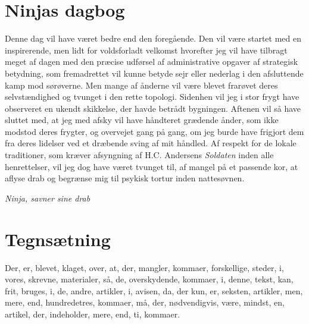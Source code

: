 \begin{minipage}[t]{100mm}
\section*{Ninjas dagbog}
Denne dag vil have været bedre end den foregående. Den vil være startet med en inspirerende, men lidt for voldsforladt velkomst hvorefter jeg vil have tilbragt meget af dagen med den præcise udførsel af administrative opgaver af strategisk betydning, som fremadrettet vil kunne betyde sejr eller nederlag i den afsluttende kamp mod sørøverne. Men mange af ånderne vil være blevet frarøvet deres selvstændighed og tvunget i den rette topologi. Sidenhen vil jeg i stor frygt have observeret en ukendt skikkelse, der havde betrådt bygningen. Aftenen vil så have sluttet med, at jeg med afsky vil have håndteret grædende ånder, som ikke modstod deres frygter, og overvejet gang på gang, om jeg burde have frigjort dem fra deres lidelser ved et dræbende sving af mit håndled. Af respekt for de lokale traditioner, som kræver afsyngning af H.C. Andersens \emph{Soldaten} inden alle henrettelser, vil jeg dog have været tvunget til, af mangel på et passende kor, at aflyse drab og begrænse mig til psykisk tortur inden nattesøvnen.

{\flushright\emph{Ninja, savner sine drab}}

\section*{Tegnsætning}
Der, er, blevet, klaget, over, at, der, mangler, kommaer, forskellige, steder, i, vores, skrevne, materialer, så, de, overskydende, kommaer, i, denne, tekst, kan, frit, bruges, i, de, andre, artikler, i, avisen, da, der kun, er, seksten, artikler, men, mere, end, hundredetres, kommaer, må, der, nødvendigvis, være, mindst, en, artikel, der, indeholder, mere, end, ti, kommaer.

\end{minipage}

